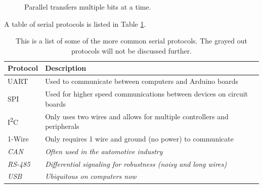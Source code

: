 \begin{figure}[!htb]
	\centering
	\caption{Parallel transfers multiple bits at a time.}
	\label{fig:parallel}
\end{figure}

A table of serial protocols is listed in Table \ref{table:serialTypes}. 

\begin{table}[!ht]
	\centering
	\begin{tabular}{l l}
		\hline
		Protocol & Description \\ 
		\hline
		UART & Used to communicate between computers and Arduino boards \\
		SPI & Used for higher speed communications between devices on circuit boards \\
		I\textsuperscript{2}C & Only uses two wires and allows for multiple controllers and peripherals \\
		1-Wire  & Only requires 1 wire and ground (no power) to communicate \\
		\rowcolor{lightgray}\emph{CAN} & \emph{Often used in the automotive industry} \\
		\rowcolor{lightgray}\emph{RS-485} & \emph{Differential signaling for robustness (noisy and long wires)} \\
		\rowcolor{lightgray}\emph{USB} & \emph{Ubiquitous on computers now} \\
		\hline
	\end{tabular}
	\caption{This is a list of some of the more common serial protocols. The grayed out protocols will not be discussed further.}
	\label{table:serialTypes}
\end{table}

